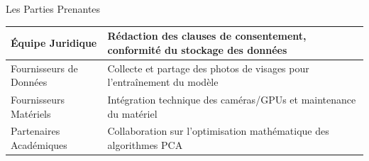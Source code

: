 \documentclass{beamer}
\begin{document}
\begin{frame}{Les Parties Prenantes}
    \begin{center}
    \begin{tabular}{|p{5cm}|p{6cm}|}
    \hline
    Équipe Juridique & 
    Rédaction des clauses de consentement, conformité du stockage des données \\
    \hline
    Fournisseurs de Données & 
    Collecte et partage des photos de visages pour l'entraînement du modèle \\
    \hline
    Fournisseurs Matériels & 
    Intégration technique des caméras/GPUs et maintenance du matériel \\
    \hline
    Partenaires Académiques & 
    Collaboration sur l'optimisation mathématique des algorithmes PCA \\
    \hline
    \end{tabular}
\end{center}
    
\end{frame}
\end{document}
